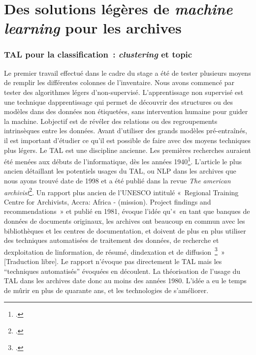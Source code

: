 \chapter{Des solutions légères de \emph{machine learning} pour les archives}

\subsection{\gls{TAL} pour la classification~: \emph{clustering} et \gls{topic}}

Le premier travail effectué dans le cadre du stage a été de tester
plusieurs moyens de remplir les différentes colonnes de l'inventaire.
Nous avons commencé par tester des algorithmes légers d'\gls{non-supervisé}. 
L'apprentissage non supervisé est une technique
d\textquotesingle apprentissage qui permet de découvrir des structures
ou des modèles dans des données non étiquetées, sans intervention
humaine pour guider la machine. L\textquotesingle objectif est de
révéler des relations ou des regroupements intrinsèques entre les
données. Avant d'utiliser des grands modèles pré-entraînés, il est
important d'étudier ce qu'il est possible de faire avec des moyens
techniques plus légers. Le \gls{TAL} est
une discipline ancienne. Les premières recherches auraient été menées aux débuts
de l'informatique, dès les années 1940\footcite{poibeau_traitement_2014}.
L'article le plus ancien détaillant les potentiels usages du TAL, ou
\gls{NLP} dans les archives que nous ayons trouvé date de 1998 et
a été publié dans la revue \emph{The american archivist}\footcite{dooley_encoded_1997}.
Un rapport plus ancien de l'UNESCO intitulé «~Regional Training Centre
for Archivists, Accra: Africa - (mission). Project findings and
recommendations~» et publié en 1981, évoque l'idée qu'«~en tant que
banques de données de documents originaux, les archives ont beaucoup en
commun avec les bibliothèques et les centres de documentation, et
doivent de plus en plus utiliser des techniques automatisées de
traitement des données, de recherche et d\textquotesingle exploitation
de l\textquotesingle information, de résumé,
d\textquotesingle indexation et de diffusion~\footcite{unesco}~» {[}Traduction libre{]}. Le rapport n'évoque pas
directement le \gls{TAL} mais les \enquote{techniques automatisés} évoquées en
découlent. La théorisation de l'usage du TAL dans les archives date donc
au moins des années 1980. L'idée a eu le temps de mûrir en plus de
quarante ans, et les technologies de s'améliorer.

